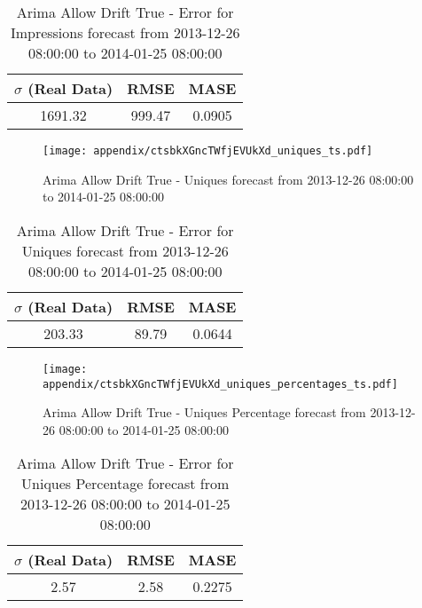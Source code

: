 \begin{table}[H]
\centering
\footnotesize
\begin{tabular}{ccc}
$\sigma$ (Real Data) & RMSE & MASE   \\ \hline
1691.32 & 999.47 & 0.0905 \\
\end{tabular}

\vspace{0.5cm}

\caption{
Arima Allow Drift True - Error for Impressions forecast from 2013-12-26 08:00:00 to 2014-01-25 08:00:00}
\end{table}

\begin{figure}[H] \begin{center} \leavevmode
\texttt{[image: appendix/ctsbkXGncTWfjEVUkXd\_uniques\_ts.pdf]} \caption{
Arima Allow Drift True - Uniques forecast from 2013-12-26 08:00:00 to 2014-01-25 08:00:00} \label{fig:appendix/ctsbkXGncTWfjEVUkXd_uniques_ts.pdf} \end{center}
\end{figure}

\begin{table}[H]
\centering
\footnotesize
\begin{tabular}{ccc}
$\sigma$ (Real Data) & RMSE & MASE   \\ \hline
203.33 & 89.79 & 0.0644 \\
\end{tabular}

\vspace{0.5cm}

\caption{
Arima Allow Drift True - Error for Uniques forecast from 2013-12-26 08:00:00 to 2014-01-25 08:00:00}
\end{table}

\begin{figure}[H] \begin{center} \leavevmode
\texttt{[image: appendix/ctsbkXGncTWfjEVUkXd\_uniques\_percentages\_ts.pdf]} \caption{
Arima Allow Drift True - Uniques Percentage forecast from 2013-12-26 08:00:00 to 2014-01-25 08:00:00} \label{fig:appendix/ctsbkXGncTWfjEVUkXd_uniques_percentages_ts.pdf} \end{center}
\end{figure}

\begin{table}[H]
\centering
\footnotesize
\begin{tabular}{ccc}
$\sigma$ (Real Data) & RMSE & MASE   \\ \hline
2.57 & 2.58 & 0.2275 \\
\end{tabular}

\vspace{0.5cm}

\caption{
Arima Allow Drift True - Error for Uniques Percentage forecast from 2013-12-26 08:00:00 to 2014-01-25 08:00:00}
\end{table}

